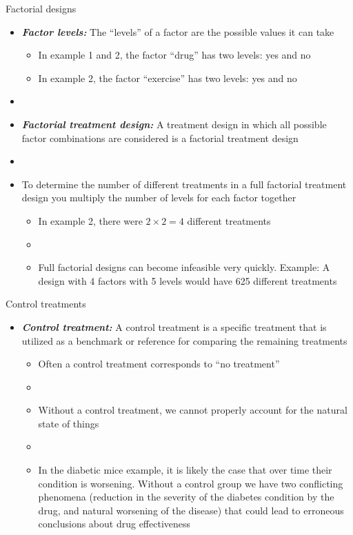 \documentclass[xcolor=dvipsnames]{beamer}
\begin{document}
\begin{frame}{Factorial designs}
	\begin{itemize}
		\item \textbf{\emph{Factor levels:}} The ``levels'' of a factor are the possible values it can take \pause
		\begin{itemize}
			\item In example 1 and 2, the factor ``drug'' has two levels: yes and no \pause
			\item In example 2, the factor ``exercise'' has two levels: yes and no \pause
		\end{itemize}
		\item[]
		\item \textbf{\emph{Factorial treatment design:}} A treatment design in which all possible factor combinations are considered is a factorial treatment design \pause
		\item[]
		\item To determine the number of different treatments in a full factorial treatment design you multiply the number of levels for each factor together \pause
		\begin{itemize}
			\item In example 2, there were $2 \times 2 = 4$ different treatments \pause
			\item[]
			\item Full factorial designs can become infeasible very quickly. Example: A design with 4 factors with 5 levels would have 625 different treatments
		\end{itemize}		
	\end{itemize}
\end{frame}

\begin{frame}{Control treatments}
	\begin{itemize}
		\item \textbf{\emph{Control treatment:}} A control treatment is a specific treatment that is utilized as a benchmark or reference for comparing the remaining treatments \pause
		\begin{itemize}
			\item Often a control treatment corresponds to ``no treatment'' \pause
			\item[]
			\item Without a control treatment, we cannot properly account for the natural state of things \pause
			\item[]
			\item In the diabetic mice example, it is likely the case that over time their condition is worsening. Without a control group we have two conflicting phenomena (reduction in the severity of the diabetes condition by the drug, and natural worsening of the disease) that could lead to erroneous conclusions about drug effectiveness
		\end{itemize}
		
	\end{itemize}
\end{frame}
\end{document}
